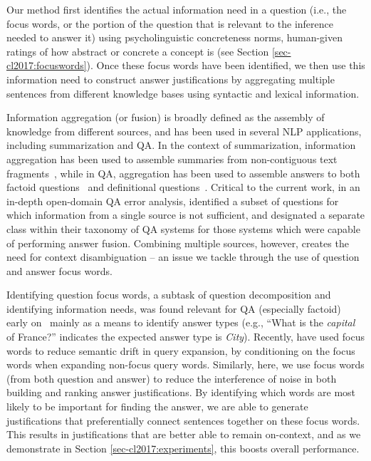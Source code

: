 Our method first identifies the actual information need in a question (i.e., the focus words, or the portion of the question that is relevant to the inference needed to answer it) using psycholinguistic concreteness norms, human-given ratings of how abstract or concrete a concept is (see Section \ref{sec-cl2017:focuswords}).
Once these focus words have been identified, we then use this information need to construct answer justifications by aggregating multiple sentences from different knowledge bases using syntactic and lexical information.  

Information aggregation (or fusion) is broadly defined as the assembly of knowledge from different sources, and has been used in several NLP applications, including summarization and QA.  In the context of summarization, information aggregation has been used to assemble summaries from non-contiguous text fragments~\citep[inter alia]{barzilay1999information,barzilay2005sentence}, while in QA, aggregation has been used to assemble answers to both factoid questions~\citep{pradhan2002building} and definitional questions~\citep{blair2003hybrid}.  Critical to the current work, in an in-depth open-domain QA error analysis, \citet{Moldovan:2003:PIE:763693.763694} identified a subset of questions for which information from a single source is not sufficient, and designated a separate class within their taxonomy of QA systems for those systems which were capable of performing answer fusion. Combining multiple sources, however, creates the need for context disambiguation -- an issue we tackle through the use of question and answer focus words.

Identifying question focus words, a subtask of question decomposition and identifying information needs, was found relevant for QA (especially factoid) early on~\citep[inter alia]{Harabagiu:00,Moldovan:2003:PIE:763693.763694} mainly as a means to identify answer types (e.g., ``What is the {\em capital} of France?'' indicates the expected answer type is \emph{City}).  
Recently, \citet{Park:2015} have used focus words to reduce semantic drift in query expansion, by conditioning on the focus words when expanding non-focus query words.
Similarly, here, we use focus words (from both question and answer) to reduce the interference of noise in both building and ranking answer justifications.  By identifying which words are most likely to be important for finding the answer, we are able to generate justifications that preferentially connect sentences together on these focus words.  This results in justifications that are better able to remain on-context, and as we demonstrate in Section \ref{sec-cl2017:experiments}, this boosts overall performance. 

